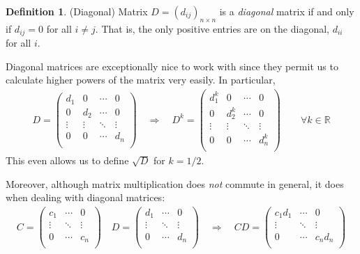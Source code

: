 \documentclass[12pt]{article}
\numberwithin{equation}{section} %
\theoremstyle{plain}
\theoremstyle{definition}
\newtheorem{defn}[thm]{Definition}
\theoremstyle{remark}
\newcommand{\R}{\mathbb{R}}
\begin{document}
\begin{defn}{(Diagonal)}
Matrix $D=(d_{ij})_{n\times n}$ is a \emph{diagonal} matrix if and only
if $d_{ij}=0$ for all $i\neq j$. That is, the only positive entries are
on the diagonal, $d_{ii}$ for all $i$.

Diagonal matrices are exceptionally nice to work with since they permit
us to calculate higher powers of the matrix very easily. In particular,
\begin{align*}
  D =
  \begin{pmatrix}
    d_1 & 0 & \cdots & 0 \\
      0 & d_2 & \cdots & 0 \\
    \vdots & \vdots & \ddots & \vdots \\
    0 & 0 & \cdots & d_n \\
  \end{pmatrix}
  \quad\Rightarrow\quad
  D^k =
  \begin{pmatrix}
    d_1^k & 0 & \cdots & 0 \\
      0 & d_2^k & \cdots & 0 \\
    \vdots & \vdots & \ddots & \vdots \\
    0 & 0 & \cdots & d_n^k \\
  \end{pmatrix}
  \qquad
  \forall k \in \R
\end{align*}
This even allows us to define $\sqrt{D}$ for $k=1/2$.

Moreover, although matrix multiplication does \emph{not} commute in
general, it does when dealing with diagonal matrices:
\begin{align*}
  C =
  \begin{pmatrix}
    c_1 & \cdots & 0 \\
    \vdots & \ddots & \vdots \\
    0 & \cdots & c_n \\
  \end{pmatrix}
  \quad
  D =
  \begin{pmatrix}
    d_1 & \cdots & 0 \\
    \vdots & \ddots & \vdots \\
    0 & \cdots & d_n \\
  \end{pmatrix}
  \quad\Rightarrow\quad
  CD =
  \begin{pmatrix}
    c_1d_1 & \cdots & 0 \\
    \vdots & \ddots & \vdots \\
    0 & \cdots & c_n d_n \\
  \end{pmatrix}
\end{align*}
\end{defn}
\end{document}
